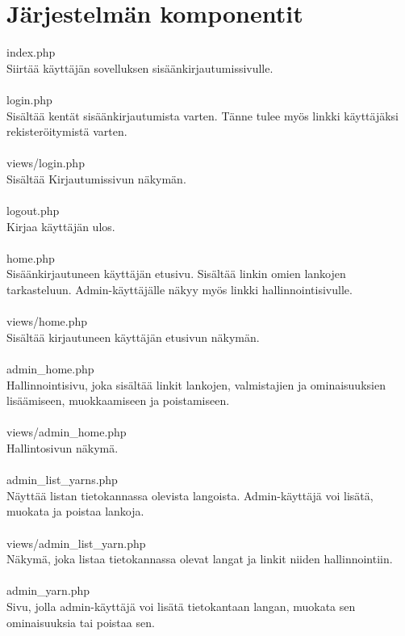 \documentclass[12pt]{article}
\begin{document}
\section{Järjestelmän komponentit}
index.php\\
Siirtää käyttäjän sovelluksen sisäänkirjautumissivulle.\\
\ \\
login.php\\
Sisältää kentät sisäänkirjautumista varten. Tänne tulee myös linkki käyttäjäksi rekisteröitymistä varten.\\
\ \\
views/login.php\\
Sisältää Kirjautumissivun näkymän.\\
\ \\
logout.php\\
Kirjaa käyttäjän ulos.\\
\ \\
home.php\\
Sisäänkirjautuneen käyttäjän etusivu. Sisältää linkin omien lankojen tarkasteluun. Admin-käyttäjälle näkyy myös linkki hallinnointisivulle.\\
\ \\
views/home.php\\
Sisältää kirjautuneen käyttäjän etusivun näkymän.\\
\ \\
admin\_home.php\\
Hallinnointisivu, joka sisältää linkit lankojen, valmistajien ja ominaisuuksien lisäämiseen, muokkaamiseen ja poistamiseen.\\
\ \\
views/admin\_home.php\\
Hallintosivun näkymä.\\ 
\ \\
admin\_list\_yarns.php\\
Näyttää listan tietokannassa olevista langoista. Admin-käyttäjä voi lisätä, muokata ja poistaa lankoja.\\
\ \\
views/admin\_list\_yarn.php\\
Näkymä, joka listaa tietokannassa olevat langat ja linkit niiden hallinnointiin.\\
\ \\
admin\_yarn.php\\
Sivu, jolla admin-käyttäjä voi lisätä tietokantaan langan, muokata sen ominaisuuksia tai poistaa sen.\\
\ \\
\end{document}

